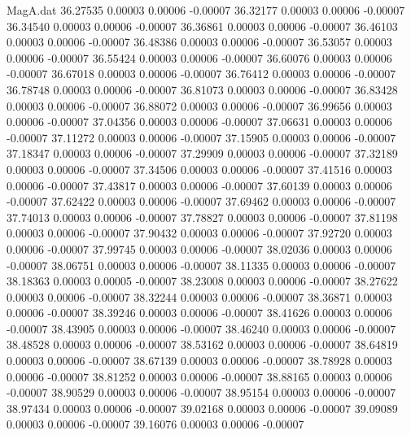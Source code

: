 \begin{filecontents}{MagA.dat}
  36.27535    0.00003    0.00006   -0.00007
  36.32177    0.00003    0.00006   -0.00007
  36.34540    0.00003    0.00006   -0.00007
  36.36861    0.00003    0.00006   -0.00007
  36.46103    0.00003    0.00006   -0.00007
  36.48386    0.00003    0.00006   -0.00007
  36.53057    0.00003    0.00006   -0.00007
  36.55424    0.00003    0.00006   -0.00007
  36.60076    0.00003    0.00006   -0.00007
  36.67018    0.00003    0.00006   -0.00007
  36.76412    0.00003    0.00006   -0.00007
  36.78748    0.00003    0.00006   -0.00007
  36.81073    0.00003    0.00006   -0.00007
  36.83428    0.00003    0.00006   -0.00007
  36.88072    0.00003    0.00006   -0.00007
  36.99656    0.00003    0.00006   -0.00007
  37.04356    0.00003    0.00006   -0.00007
  37.06631    0.00003    0.00006   -0.00007
  37.11272    0.00003    0.00006   -0.00007
  37.15905    0.00003    0.00006   -0.00007
  37.18347    0.00003    0.00006   -0.00007
  37.29909    0.00003    0.00006   -0.00007
  37.32189    0.00003    0.00006   -0.00007
  37.34506    0.00003    0.00006   -0.00007
  37.41516    0.00003    0.00006   -0.00007
  37.43817    0.00003    0.00006   -0.00007
  37.60139    0.00003    0.00006   -0.00007
  37.62422    0.00003    0.00006   -0.00007
  37.69462    0.00003    0.00006   -0.00007
  37.74013    0.00003    0.00006   -0.00007
  37.78827    0.00003    0.00006   -0.00007
  37.81198    0.00003    0.00006   -0.00007
  37.90432    0.00003    0.00006   -0.00007
  37.92720    0.00003    0.00006   -0.00007
  37.99745    0.00003    0.00006   -0.00007
  38.02036    0.00003    0.00006   -0.00007
  38.06751    0.00003    0.00006   -0.00007
  38.11335    0.00003    0.00006   -0.00007
  38.18363    0.00003    0.00005   -0.00007
  38.23008    0.00003    0.00006   -0.00007
  38.27622    0.00003    0.00006   -0.00007
  38.32244    0.00003    0.00006   -0.00007
  38.36871    0.00003    0.00006   -0.00007
  38.39246    0.00003    0.00006   -0.00007
  38.41626    0.00003    0.00006   -0.00007
  38.43905    0.00003    0.00006   -0.00007
  38.46240    0.00003    0.00006   -0.00007
  38.48528    0.00003    0.00006   -0.00007
  38.53162    0.00003    0.00006   -0.00007
  38.64819    0.00003    0.00006   -0.00007
  38.67139    0.00003    0.00006   -0.00007
  38.78928    0.00003    0.00006   -0.00007
  38.81252    0.00003    0.00006   -0.00007
  38.88165    0.00003    0.00006   -0.00007
  38.90529    0.00003    0.00006   -0.00007
  38.95154    0.00003    0.00006   -0.00007
  38.97434    0.00003    0.00006   -0.00007
  39.02168    0.00003    0.00006   -0.00007
  39.09089    0.00003    0.00006   -0.00007
  39.16076    0.00003    0.00006   -0.00007

\end{filecontents}
